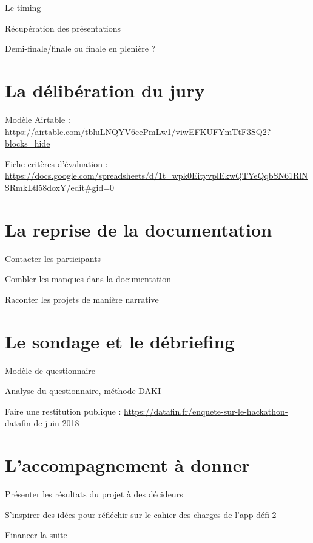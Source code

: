 \documentclass[]{book}
\begin{document}
Le timing

Récupération des présentations

Demi-finale/finale ou finale en plenière ?

\section{La délibération du jury}\label{la-deliberation-du-jury}

Modèle Airtable :
\url{https://airtable.com/tbluLNQYV6eePmLw1/viwEFKUFYmTtF3SQ2?blocks=hide}

Fiche critères d'évaluation :
\url{https://docs.google.com/spreadsheets/d/1t_wpk0EityvplEkwQTYeQqbSN61RlNSRmkLtl58doxY/edit\#gid=0}

\section{La reprise de la
documentation}\label{la-reprise-de-la-documentation}

Contacter les participants

Combler les manques dans la documentation

Raconter les projets de manière narrative

\section{Le sondage et le débriefing}\label{le-sondage-et-le-debriefing}

Modèle de questionnaire

Analyse du questionnaire, méthode DAKI

Faire une restitution publique :
\url{https://datafin.fr/enquete-sur-le-hackathon-datafin-de-juin-2018}

\section{L'accompagnement à donner}\label{laccompagnement-a-donner}

Présenter les résultats du projet à des décideurs

S'inspirer des idées pour réfléchir sur le cahier des charges de l'app
défi 2

Financer la suite


\end{document}
